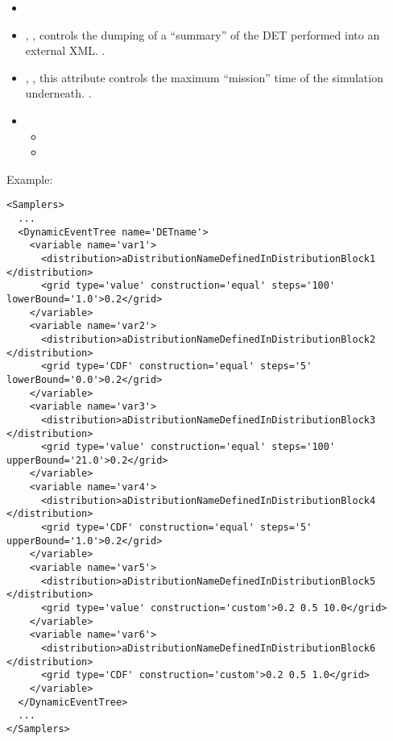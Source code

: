%
\attrsIntro
\begin{itemize}
  \itemsep0em
  \item \nameDescription
  \item {}, ,
    controls the dumping of a ``summary'' of the DET performed into an external
    XML.
    .
  \item {}, , this
    attribute controls the maximum ``mission'' time of the simulation
    underneath.
    .
\end{itemize}
\begin{itemize}
\item \variableDescription
  \variableChildrenIntro
  \begin{itemize}
    \item \distributionDescription
    \item \gridDescription
  \end{itemize}
\end{itemize}

Example:
\begin{lstlisting}[style=XML]
<Samplers>
  ...
  <DynamicEventTree name='DETname'> 
    <variable name='var1'> 
      <distribution>aDistributionNameDefinedInDistributionBlock1 </distribution> 
      <grid type='value' construction='equal' steps='100' lowerBound='1.0'>0.2</grid> 
    </variable> 
    <variable name='var2'> 
      <distribution>aDistributionNameDefinedInDistributionBlock2 </distribution> 
      <grid type='CDF' construction='equal' steps='5' lowerBound='0.0'>0.2</grid> 
    </variable>
    <variable name='var3'> 
      <distribution>aDistributionNameDefinedInDistributionBlock3 </distribution> 
      <grid type='value' construction='equal' steps='100' upperBound='21.0'>0.2</grid> 
    </variable> 
    <variable name='var4'> 
      <distribution>aDistributionNameDefinedInDistributionBlock4 </distribution> 
      <grid type='CDF' construction='equal' steps='5' upperBound='1.0'>0.2</grid> 
    </variable>
    <variable name='var5'> 
      <distribution>aDistributionNameDefinedInDistributionBlock5 </distribution> 
      <grid type='value' construction='custom'>0.2 0.5 10.0</grid> 
    </variable> 
    <variable name='var6'> 
      <distribution>aDistributionNameDefinedInDistributionBlock6 </distribution> 
      <grid type='CDF' construction='custom'>0.2 0.5 1.0</grid> 
    </variable>
  </DynamicEventTree>
  ...
</Samplers>
\end{lstlisting}

